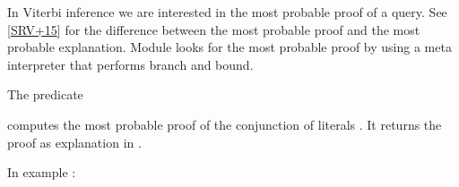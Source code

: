 \documentclass[letterpaper,10pt,english]{sphinxmanual}
\begin{document}
\sphinxAtStartPar
In Viterbi inference we are interested in the most probable proof of a query. See {[}\hyperlink{cite.index:id44}{SRV+15}{]}
for the difference between the most probable proof and the most probable explanation.
Module  looks for the most probable proof by using a meta interpreter
that performs branch and bound.

\sphinxAtStartPar
The predicate

\begin{sphinxVerbatim}[commandchars=\\\{\}]
  
\end{sphinxVerbatim}

\sphinxAtStartPar
computes the most probable proof of the conjunction of literals .
It returns the proof as explanation in .

\sphinxAtStartPar
In example :

\begin{sphinxVerbatim}[commandchars=\\\{\}]
 

 

 

   
   


 
\end{sphinxVerbatim}
\end{document}
